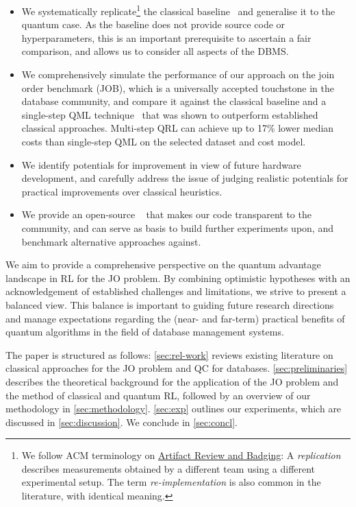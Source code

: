 \documentclass[10pt, conference]{IEEEtran}
\begin{document}
\begin{itemize}
  \item We systematically replicate\footnote{We follow
      ACM terminology on \href{https://www.acm.org/publications/policies/artifact-review-and-badging-current}{Artifact Review and Badging}: A 
      \emph{replication} describes measurements obtained by a different team 
      using a different experimental setup. The term \emph{re-implementation} is 
      also common in the literature, with identical meaning.} the classical baseline~\cite{marcus18} and generalise it to the quantum case. As the baseline does not provide
      source code or hyperparameters, this is an important prerequisite to ascertain a fair comparison, and allows us to consider all aspects of the DBMS.
  \item We comprehensively simulate the performance of our approach on the join order benchmark (JOB), which is
  a universally accepted touchstone in the database community, and compare it against the classical baseline and a single-step QML technique~\cite{winker23} that was shown to outperform established classical approaches.
    Multi-step QRL can achieve up to 17\% lower median costs than single-step QML on the selected dataset and cost model.
  \item We identify potentials for improvement in view of future hardware development, and 
  carefully address the issue of judging realistic potentials for practical improvements over classical heuristics.
  \item We provide an open-source \repro~\cite{mauerer:22:q-saner} that makes our code
  transparent to the community, and can serve as basis to build further
  experiments upon, and benchmark alternative approaches against.
\end{itemize}

We aim to provide a comprehensive perspective on the quantum advantage landscape in RL for the JO problem.
By combining optimistic hypotheses with an acknowledgement of established challenges and limitations, we strive to present a balanced view.
This balance is important to guiding future research directions and manage expectations regarding the (near- and far-term) practical benefits of quantum algorithms in the
field of database management systems.


The paper is structured as follows:
\autoref{sec:rel-work} reviews existing literature on classical approaches for the JO problem and QC for databases.
\autoref{sec:preliminaries} describes the theoretical background for the application of the JO problem and the method of classical and quantum RL, followed by an overview of our methodology in \autoref{sec:methodology}.
\autoref{sec:exp} outlines our experiments, which are discussed in \autoref{sec:discussion}.
We conclude in \autoref{sec:concl}.
\end{document}
